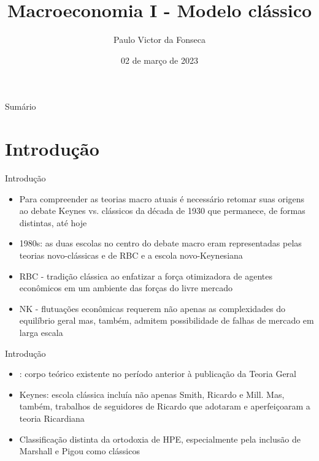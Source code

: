 \documentclass[10pt]{beamer}
\title[]{Macroeconomia I - Modelo clássico}
\author[]{Paulo Victor da Fonseca}
\date{02 de março de 2023}
\begin{document}
\begin{frame}[plain]
\end{frame}

\begin{frame}{Sumário}
    \tableofcontents
\end{frame}

\section{Introdução}
\begin{frame}{Introdução}
    \begin{itemize}
        \item Para compreender as teorias macro atuais é necessário retomar suas origens ao debate Keynes vs. clássicos da década de 1930 que permanece, de formas distintas, até hoje\bigskip

        \item 1980s: as duas escolas no centro do debate macro eram representadas pelas teorias novo-clássicas e de RBC e a escola novo-Keynesiana\bigskip

        \item RBC - tradição clássica ao enfatizar a força otimizadora de agentes econômicos em um ambiente das forças do livre mercado\bigskip

        \item NK - flutuações econômicas requerem não apenas as complexidades do equilíbrio geral mas, também, admitem possibilidade de falhas de mercado em larga escala
    \end{itemize}
\end{frame}

\begin{frame}{Introdução}
    \begin{itemize}
        \item {}: corpo teórico existente no período anterior à publicação da Teoria Geral\bigskip

        \item Keynes: escola clássica incluía não apenas Smith, Ricardo e Mill. Mas, também, trabalhos de seguidores de Ricardo que adotaram e aperfeiçoaram a teoria Ricardiana\bigskip

        \item Classificação distinta da ortodoxia de HPE, especialmente pela inclusão de Marshall e Pigou como clássicos
    \end{itemize}
\end{frame}
\end{document}
